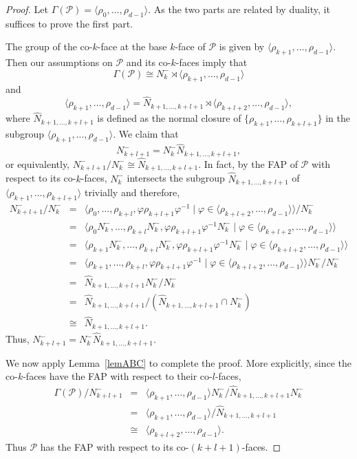 \documentclass[12pt]{amsart}
\theoremstyle{definition}
\begin{document}
\begin{proof}
Let $\Gamma(\mathcal{P}) = \langle\rho_{0},\ldots,\rho_{d-1}\rangle$. As the two parts are related by duality, it suffices to prove the first part. 

The group of the co-$k$-face at the base $k$-face of $\mathcal{P}$ is given by $\langle\rho_{k+1},\ldots,\rho_{d-1}\rangle$. Then our assumptions on $\mathcal{P}$ and its co-$k$-faces imply that 
\[\Gamma(\mathcal{P}) \cong N_{k}^{-} \rtimes \langle\rho_{k+1},\ldots,\rho_{d-1}\rangle\]
and
\[\langle\rho_{k+1},\ldots,\rho_{d-1}\rangle =
\hat{N}_{k+1,\ldots,k+l+1} \rtimes \langle\rho_{k+l+2},\ldots,\rho_{d-1}\rangle,\]
where $\hat{N}_{k+1,\ldots,k+l+1}$ is defined as the normal closure of $\{\rho_{k+1},\ldots,\rho_{k+l+1}\}$ in the subgroup $\langle\rho_{k+1},\ldots,\rho_{d-1}\rangle$. We claim that 
\begin{equation}
\label{herNs}
N_{k+l+1}^{-} = N_{k}^{-}\hat{N}_{k+1,\ldots,k+l+1},
\end{equation}
or equivalently, $N_{k+l+1}^{-}/N_{k}^{-}\cong \hat{N}_{k+1,\ldots,k+l+1}$.
In fact, by the FAP of $\mathcal{P}$ with respect to its co-$k$-faces, $N_k^{-}$ intersects the subgroup $\hat{N}_{k+1,\ldots,k+l+1}$  of $\langle\rho_{k+1},\ldots,\rho_{k+l+1}\rangle$ 
trivially and therefore, 
\[\begin{array}{rcl}
N_{k+l+1}^{-}/ N_{k}^{-}&= &
\langle\rho_{0},\ldots,\rho_{k+l},\varphi\rho_{k+l+1}\varphi^{-1}\!\mid\! \varphi\in\langle\rho_{k+l+2},\ldots,\rho_{d-1}\rangle\rangle/N_{k}^{-}\\
&=&
\langle\rho_{0}N_{k}^{-},\ldots,\rho_{k+l}N_{k}^{-},\varphi\rho_{k+l+1}\varphi^{-1}N_{k}^{-}\mid \varphi\in\langle\rho_{k+l+2},\ldots,\rho_{d-1}\rangle\rangle\\
&=&
\langle\rho_{k+1}N_{k}^{-},\ldots,\rho_{k+l}N_{k}^{-},\varphi\rho_{k+l+1}\varphi^{-1}N_{k}^{-}\mid \varphi\in\langle\rho_{k+l+2},\ldots,\rho_{d-1}\rangle\rangle\\
&=&
\langle\rho_{k+1},\ldots,\rho_{k+l},\varphi\rho_{k+l+1}\varphi^{-1}\mid \varphi\in\langle\rho_{k+l+2},\ldots,\rho_{d-1}\rangle\rangle N_{k}^{-}/N_{k}^{-}\\
&=&\hat{N}_{k+1,\ldots,k+l+1} N_{k}^{-}/N_{k}^{-}\\
&=&\hat{N}_{k+1,\ldots,k+l+1}/(\hat{N}_{k+1,\ldots,k+l+1}\cap N_{k}^{-})\\
&\cong&\hat{N}_{k+1,\ldots,k+l+1}.
\end{array}\]
Thus, $N_{k+l+1}^{-} = N_{k}^{-}\hat{N}_{k+1,\ldots,k+l+1}$.

We now apply Lemma~\ref{lemABC} to complete the proof. More explicitly, since the co-$k$-faces have the FAP with respect to their co-$l$-faces,
\[\begin{array}{rcl}
\Gamma(\mathcal{P})/N_{k+l+1}^{-}
&=&\langle\rho_{k+1},\ldots,\rho_{d-1}\rangle N_{k}^{-} / \hat{N}_{k+1,\ldots,k+l+1}N_{k}^{-} \\
&=&\langle\rho_{k+1},\ldots,\rho_{d-1}\rangle / \hat{N}_{k+1,\ldots,k+l+1}\\
&\cong&\langle\rho_{k+l+2},\ldots,\rho_{d-1}\rangle.
\end{array}\]
Thus $\mathcal{P}$ has the FAP with respect to its co-$(k+l+1)$-faces. 
\end{proof}
\medskip
\end{document}
